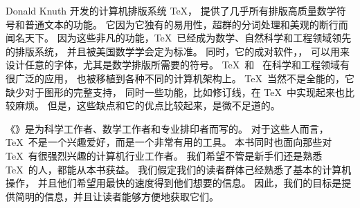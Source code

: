 


Donald Knuth 开发的计算机排版系统 \TeX ，
提供了几乎所有排版高质量数学符号和普通文本的功能。
它因为它独有的易用性，超群的分词处理和美观的断行而闻名天下。
因为这些非凡的功能，\TeX\ 已经成为数学、自然科学和工程领域领先的排版系统，
并且被美国数学学会定为标准。
同时，它的成对软件，\Metafont{}，
可以用来设计任意的字体，尤其是数学排版所需要的符号。
\TeX\ 和 \Metafont\ 在科学和工程领域有很广泛的应用，
也被移植到各种不同的计算机架构上。
\TeX\ 当然不是全能的，它缺少对于图形的完整支持，
同时一些功能，比如修订线，在 \TeX\ 中实现起来也比较麻烦。
但是，这些缺点和它的优点比较起来，是微不足道的。

《\thisbook 》是为科学工作者、数学工作者和专业排印者而写的。
对于这些人而言，\TeX\ 不是一个兴趣爱好，而是一个非常有用的工具。
本书同时也面向那些对 \TeX\ 有很强烈兴趣的计算机行业工作者。
我们希望不管是新手们还是熟悉 \TeX\ 的人，都能从本书获益。
我们假定我们的读者群体己经熟悉了基本的计算机操作，
并且他们希望用最快的速度得到他们想要的信息。
因此，我们的目标是提供简明的信息，并且让读者能够方便地获取它们。

